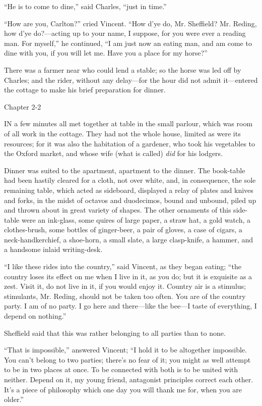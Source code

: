 ``He is to come to dine,'' said Charles, ``just in
time.''

``How are you, Carlton?'' cried Vincent. ``How d'ye do,
Mr. Sheffield? Mr. Reding, how d'ye do?—acting up to your name, I
suppose, for you were ever a reading man. For myself,'' he
continued, ``I am just now an eating man, and am come to dine with
you, if you will let me. Have you a place for my horse?''

There was a farmer near who could lend a stable; so the horse was
led off by Charles; and the rider, without any delay—for the hour
did not admit it—entered the cottage to make his brief preparation
for dinner.

Chapter 2-2


IN a few minutes all met together at
table in the small parlour, which was room of all work in the cottage.
They had not the whole house, limited as were its resources; for it
was also the habitation of a gardener, who took his vegetables to the
Oxford market, and whose wife (what is called) \emph{did} for his
lodgers.

Dinner was suited to the apartment, apartment to the dinner. The
book-table had been hastily cleared for a cloth, not over white, and,
in consequence, the sole remaining table, which acted as sideboard,
displayed a relay of plates and knives and forks, in the midst of
octavos and duodecimos, bound and unbound, piled up and thrown about
in great variety of shapes. The other ornaments of this side-table
were an ink-glass, some quires of large paper, a straw hat, a gold
watch, a clothes-brush, some bottles of ginger-beer, a pair of gloves,
a case of cigars, a neck-handkerchief, a shoe-horn, a small slate, a
large clasp-knife, a hammer, and a handsome inlaid writing-desk.

``I like these rides into the country,'' said Vincent, as
they began eating; ``the country loses its effect on me when I
live in it, as you do; but it is exquisite as a zest. Visit it,
do not live in it, if you would enjoy it. Country air is a stimulus;
stimulants, Mr. Reding, should not be taken too often. You are of the
country party. I am of no party. I go here and there—like the bee—I
taste of everything, I depend on nothing.''

Sheffield said that this was rather belonging to all parties than
to none.

``That is impossible,'' answered Vincent; ``I hold it
to be altogether impossible. You can't belong to two parties; there's
no fear of it; you might as well attempt to be in two places at once.
To be connected with both is to be united with neither. Depend on it,
my young friend, antagonist principles correct each other. It's a
piece of philosophy which one day you will thank me for, when you are
older.''


